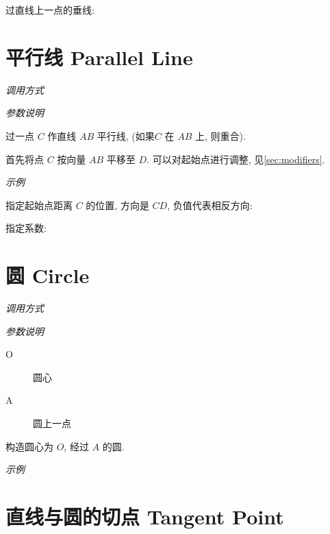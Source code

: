 过直线上一点的垂线:


\section{平行线 Parallel Line}

\emph{调用方式}

\begin{tcolorbox}{}
\end{tcolorbox}

\emph{参数说明}

过一点 $C$ 作直线 $AB$ 平行线, (如果$C$ 在 $AB$ 上, 则重合).

首先将点 $C$ 按向量 $AB$ 平移至 $D$. 
可以对起始点进行调整, 见\ref{sec:modifiers}.

\emph{示例}

指定起始点距离 $C$ 的位置, 方向是 $CD$, 负值代表相反方向:


指定系数:


\section{圆 Circle}

\emph{调用方式}

\begin{tcolorbox}{}
\end{tcolorbox}

\emph{参数说明}

\begin{description}
  \item[O] 圆心
  \item[A] 圆上一点
\end{description}

构造圆心为 $O$, 经过 $A$ 的圆.

\emph{示例}


\section{直线与圆的切点 Tangent Point}

